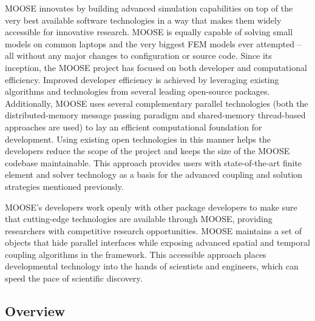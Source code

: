 \documentclass{INLreport}
\begin{document}
MOOSE innovates by building advanced simulation capabilities on top of the very best available software technologies in a way that
makes them widely accessible for innovative research. MOOSE is equally capable of solving small models on common laptops and
the very biggest FEM models ever attempted -- all without any major changes to configuration or source code. Since its
inception, the MOOSE project has focused on both developer and computational efficiency. Improved developer efficiency is
achieved by leveraging existing algorithms and technologies from several leading open-source packages. Additionally, MOOSE uses
several complementary parallel technologies (both the distributed-memory message passing paradigm and shared-memory thread-based
approaches are used) to lay an efficient computational foundation for development. Using existing open technologies in this
manner helps the developers reduce the scope of the project and keeps the size of the MOOSE codebase maintainable. This approach
provides users with state-of-the-art finite element and solver technology as a basis for the advanced coupling and solution
strategies mentioned previously.

MOOSE’s developers work openly with other package developers to make sure that cutting-edge
technologies are available through MOOSE, providing researchers with competitive research opportunities. MOOSE maintains a set
of objects that hide parallel interfaces while exposing advanced spatial and temporal coupling algorithms in the framework.
This accessible approach places developmental technology into the hands of scientists and engineers, which can speed the pace of
scientific discovery.

\subsection{Overview}
\end{document}
